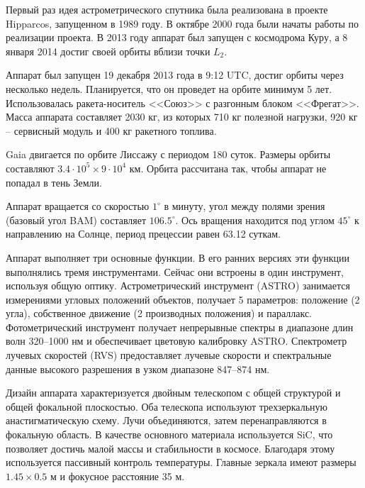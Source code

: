 \documentclass[14pt]{article} %
\begin{document}
Первый раз идея астрометрического спутника была реализована в проекте Hipparcos, запущенном в 1989 году. В октябре 2000 года были начаты работы по реализации проекта. В 2013 году аппарат был запущен с космодрома Куру, а 8 января 2014 достиг своей орбиты вблизи точки $L_2$.

Аппарат был запущен 19 декабря 2013 года в 9:12 UTC, достиг орбиты через несколько недель. Планируется, что он проведет на орбите минимум 5 лет. Использовалась ракета-носитель <<Союз>> с разгонным блоком <<Фрегат>>. Масса аппарата составляет 2030 кг, из которых 710 кг полезной нагрузки, 920 кг -- сервисный модуль и 400 кг ракетного топлива.

Gaia двигается по орбите Лиссажу с периодом 180 суток. Размеры орбиты составляют $3.4\cdot10^5 \times 9\cdot10^4$ км. Орбита рассчитана так, чтобы аппарат не попадал в тень Земли.

Аппарат вращается со скоростью $1^\circ$ в минуту, угол между полями зрения (базовый угол BAM) составляет $106.5^\circ$. Ось вращения находится под углом $45^\circ$ к направлению на Солнце, период прецессии равен 63.12 суткам.

Аппарат выполняет три основные функции. В его ранних версиях эти функции выполнялись тремя инструментами. Сейчас они встроены в один инструмент, используя общую оптику. Астрометрический инструмент (ASTRO) занимается измерениями угловых положений объектов, получает 5 параметров: положение (2 угла), собственное движение (2 производных положения) и параллакс. Фотометрический инструмент получает непрерывные спектры в диапазоне длин волн 320--1000 нм и обеспечивает цветовую калибровку ASTRO. Спектрометр лучевых скоростей (RVS) предоставляет лучевые скорости и спектральные данные высокого разрешения в узком диапазоне 847--874 нм.

Дизайн аппарата характеризуется двойным телескопом с общей структурой и общей фокальной плоскостью. Оба телескопа используют трехзеркальную анастигматическую схему. Лучи объединяются, затем перенаправляются в фокальную область. В качестве основного материала используется SiC, что позволяет достичь малой массы и стабильности в космосе. Благодаря этому используется пассивный контроль температуры. Главные зеркала имеют размеры $1.45\times0.5$ м и фокусное расстояние 35 м.
\end{document}

